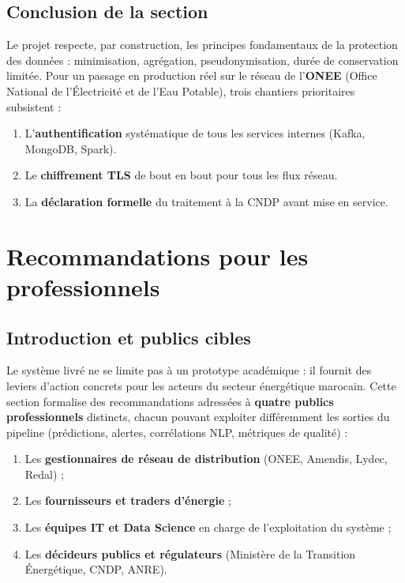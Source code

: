 \documentclass[11pt,a4paper]{article}
\begin{document}
\subsection{Conclusion de la section}
Le projet respecte, par construction, les principes fondamentaux de la protection des données : minimisation, agrégation, pseudonymisation, durée de conservation limitée. Pour un passage en production réel sur le réseau de l'\textbf{ONEE} (Office National de l'Électricité et de l'Eau Potable), trois chantiers prioritaires subsistent :
\begin{enumerate}
  \item L'\textbf{authentification} systématique de tous les services internes (Kafka, MongoDB, Spark).
  \item Le \textbf{chiffrement TLS} de bout en bout pour tous les flux réseau.
  \item La \textbf{déclaration formelle} du traitement à la CNDP avant mise en service.
\end{enumerate}

\newpage

\section{Recommandations pour les professionnels}
\label{sec:recommandations}

\subsection{Introduction et publics cibles}

Le système livré ne se limite pas à un prototype académique : il fournit des leviers d'action concrets pour les acteurs du secteur énergétique marocain. Cette section formalise des recommandations adressées à \textbf{quatre publics professionnels} distincts, chacun pouvant exploiter différemment les sorties du pipeline (prédictions, alertes, corrélations NLP, métriques de qualité) :

\begin{enumerate}
  \item Les \textbf{gestionnaires de réseau de distribution} (ONEE, Amendis, Lydec, Redal) ;
  \item Les \textbf{fournisseurs et traders d'énergie} ;
  \item Les \textbf{équipes IT et Data Science} en charge de l'exploitation du système ;
  \item Les \textbf{décideurs publics et régulateurs} (Ministère de la Transition Énergétique, CNDP, ANRE).
\end{enumerate}
\end{document}
